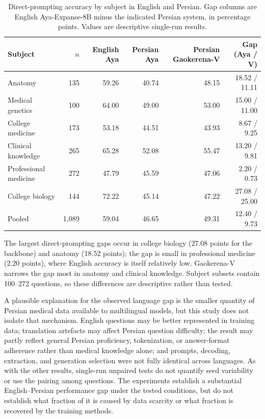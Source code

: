 \documentclass[manuscript,screen,review]{acmart}
\begin{document}
\begin{table}[ht]
\caption{Direct-prompting accuracy by subject in English and Persian. Gap columns are English Aya-Expanse-8B minus the indicated Persian system, in percentage points. Values are descriptive single-run results.}\label{tab:en_fa_subject}
\small
\begin{tabular}{@{}lrrrrr@{}}
\toprule
Subject & $n$ & English Aya & Persian Aya & Persian Gaokerena-V & Gap (Aya / V) \\
\midrule
Anatomy & 135 & 59.26 & 40.74 & 48.15 & 18.52 / 11.11 \\
Medical genetics & 100 & 64.00 & 49.00 & 53.00 & 15.00 / 11.00 \\
College medicine & 173 & 53.18 & 44.51 & 43.93 & 8.67 / 9.25 \\
Clinical knowledge & 265 & 65.28 & 52.08 & 55.47 & 13.20 / 9.81 \\
Professional medicine & 272 & 47.79 & 45.59 & 47.06 & 2.20 / 0.73 \\
College biology & 144 & 72.22 & 45.14 & 47.22 & 27.08 / 25.00 \\
\midrule
Pooled & 1,089 & 59.04 & 46.65 & 49.31 & 12.40 / 9.73 \\
\bottomrule
\end{tabular}
\end{table}

The largest direct-prompting gaps occur in college biology (27.08 points for the backbone) and anatomy (18.52 points); the gap is small in professional medicine (2.20 points), where English accuracy is itself relatively low. Gaokerena-V narrows the gap most in anatomy and clinical knowledge. Subject subsets contain 100--272 questions, so these differences are descriptive rather than tested.

A plausible explanation for the observed language gap is the smaller quantity of Persian medical data available to multilingual models, but this study does not isolate that mechanism. English questions may be better represented in training data; translation artefacts may affect Persian question difficulty; the result may partly reflect general Persian proficiency, tokenization, or answer-format adherence rather than medical knowledge alone; and prompts, decoding, extraction, and generation selection were not fully identical across languages. As with the other results, single-run unpaired tests do not quantify seed variability or use the pairing among questions. The experiments establish a substantial English--Persian performance gap under the tested conditions, but do not establish what fraction of it is caused by data scarcity or what fraction is recovered by the training methods.
\end{document}
